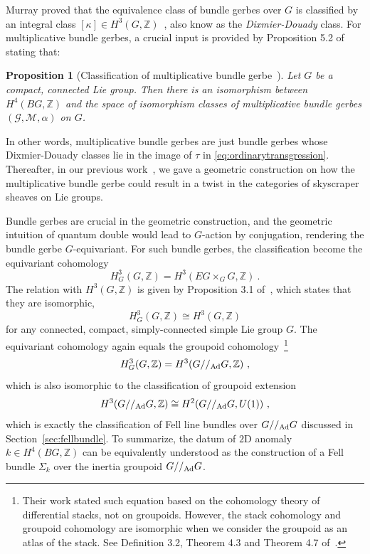 \documentclass[a4paper,11pt]{article}
\newtheorem{prop}[lemma]{Proposition}
\newcommand{\be}{\begin{equation}}
\newcommand{\ee}{\end{equation}}
\def\bbZ{\mathbb{Z}}
\def\gmg{G//_{\rm Ad} G}
\begin{document}
Murray proved that the equivalence class of bundle gerbes over $G$ is classified by an integral class $[\kappa]\in H^3(G,\bbZ)$~\cite{Murray:1996bdg,Murray:2000sit}, also know as the \emph{Dixmier-Douady} class.  For multiplicative bundle gerbes, a crucial input is provided by Proposition 5.2 of~\cite{Carey:2004xt} stating that:
\begin{prop}[Classification of multiplicative bundle gerbe~\cite{Carey:2004xt}]
    Let $G$ be a compact, connected Lie group. Then there is an isomorphism between $H^4(B G , \mathbb{Z})$ and the space of isomorphism classes of multiplicative bundle gerbes $(\mathscr{G},\mathscr{M},\alpha)$ on $G$.
\end{prop}
In other words, multiplicative bundle gerbes are just bundle gerbes whose Dixmier-Douady classes lie in the image of $\tau$ in \eqref{eq:ordinarytransgression}. Thereafter, in our previous work~\cite{Jia:2025vrj}, we gave a geometric construction on how the multiplicative bundle gerbe could result in a twist in the categories of skyscraper sheaves on Lie groups.

Bundle gerbes are crucial in the geometric construction, and the geometric intuition of quantum double would lead to $G$-action by conjugation, rendering the bundle gerbe $G$-equivariant. For such bundle gerbes, the classification become the equivariant cohomology
\be  H^3_G(G,\bbZ) =  H^3(EG\times_G G,\bbZ) \ . \ee
The relation with $H^3(G,\bbZ)$ is given by Proposition 3.1 of~\cite{Carey:2008}, which states that they are isomorphic,
\be  H^3_G(G,\bbZ)  \cong H^3(G,\bbZ)  \ee
for any connected, compact, simply-connected simple Lie group $G$. The equivariant cohomology again equals the groupoid cohomology~\cite{BarbosaTorres:2021}\footnote{Their work stated such equation based on the cohomology theory of differential stacks, not on groupoids. However, the stack cohomology and groupoid cohomology are isomorphic when we consider the groupoid as an atlas of the stack. See Definition 3.2, Theorem 4.3 and Theorem 4.7 of~\cite{BarbosaTorres:2021}.}
\be  H^3_G(G,\bbZ) =  H^3(G//_{\rm Ad}G,\bbZ)  \ , \ee
which is also isomorphic to the classification of groupoid extension~\cite{Tu:2003ph}
\be H^3(G//_{\rm Ad}G,\bbZ) \cong H^2(G//_{\rm Ad}G,U(1)) \ ,  \ee
which is exactly the classification of Fell line bundles over $\gmg$ discussed in Section~\ref{sec:fellbundle}. 
To summarize, the datum of $2$D anomaly $k\in H^4(BG,\bbZ)$ can be equivalently understood as the construction of a Fell bundle $\Sigma_k$ over the inertia groupoid $\gmg$.
\end{document}
